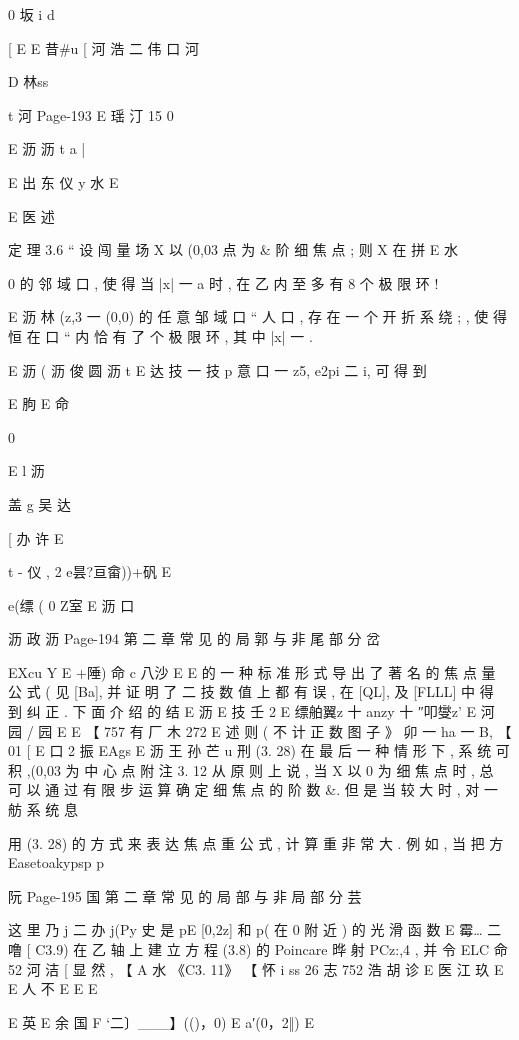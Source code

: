 {{{{{{{{{{{{{{{0 坂 i d

[ E
E 昔#u [ 河 浩 二 伟 口 河

D 林ss

t 河
Page-193
E 瑶 汀 15 0

E 沥 沥 t a |

E 出 东 仪 y 水
E

E 医 述

定 理 3.6 “ 设 闯 量 场 X 以 (0,03 点 为 & 阶 细 焦 点 ; 则 X 在 拼
E 水

0
的 邻 域 口 , 使 得 当 |x| 一 a 时 , 在 乙 内 至 多 有 8 个 极 限 环 !

E 沥 林
(z,3 一 (0,0) 的 任 意 邹 域 口 “ 人 口 , 存 在 一 个 开 折 系 绕 ; , 使 得
恒 在 口 “ 内 恰 有 了 个 极 限 环 , 其 中 |x| 一 .

E 沥 ( 沥 俊 圆 沥 t
E 达 技 一 技 p
意 口 一 z5, e2pi 二 i, 可 得 到

{ E 朐
E 命

0

E l 沥

盖 g 吴 达

[
办 许
E

t - 仪 ,
2 e昙?亘畲))+矾 E

e(缥 (
0 Z室 E 沥 口

沥 政 沥
Page-194
第 二 章 常 见 的 局 郭 与 非 尾 部 分 岔

EXcu Y
E +陲) 命
c 八沙
E
E
的 一 种 标 准 形 式 导 出 了 著 名 的 焦 点 量 公 式 ( 见 [Ba], 并 证 明 了 二
技
数 值 上 都 有 误 , 在 [QL], 及 [FLLL] 中 得 到 纠 正 . 下 面 介 绍 的 结
E 沥
E 技
壬 2 E 缥舶翼z 十 anzy 十 ″叩燮z'
E 河 园 / 园
E
E
【 757 有 厂 木 272
E 述
则 ( 不 计 正 数 图 子 》
卯 一 ha 一 B,
【 01
[ E 口 2 振 EAgs
E 沥 王 孙 芒 u 刑
(3. 28)
在 最 后 一 种 情 形 下 , 系 统 可 积 ,(0,03 为 中 心 点
附 注 3. 12 从 原 则 上 说 , 当 X 以 0 为 细 焦 点 时 , 总 可 以 通 过
有 限 步 运 算 确 定 细 焦 点 的 阶 数 &. 但 是 当 较 大 时 , 对 一 舫 系 统 息

用 (3. 28) 的 方 式 来 表 达 焦 点 重 公 式 , 计 算 重 非 常 大 . 例 如 , 当 把 方
Easetoakypsp p

阮
Page-195
国 第 二 章 常 见 的 局 部 与 非 局 部 分 芸

这 里 乃 j 二 办 j(Py 史 是 pE [0,2z] 和 p( 在 0 附 近 ) 的 光 滑 函 数
E
霉… 二 噜 [ C3.9)
在 乙 轴 上 建 立 方 程 (3.8) 的 Poincare 晔 射 PCz:,4 , 并 令
ELC 命 52 河 洁 [
显 然 ,
【 A 水 《C3. 11》
【 怀 i ss 26 志 752 浩 胡 诊
E
医 江 玖
E
E 人 不
E
E
E

E 英 E 余 国
F `二〕___】(()，0) E a′(0，2‖) E

}}}}}}}}}}}}}}}}
